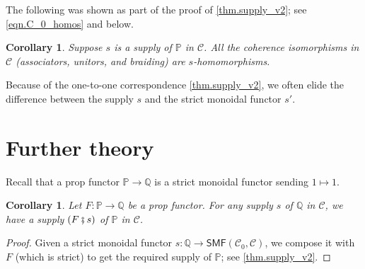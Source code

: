 \documentclass[11pt, oneside, article]{memoir}
\theoremstyle{plain}
\newtheorem{corollary}[theorem]{Corollary}
\theoremstyle{definition}
\theoremstyle{remark}
\newcommand{\cat}[1]{\mathcal{#1}}%
\newcommand{\Cat}[1]{{\mathsf{#1}}}%
\newcommand{\smf}{\Cat{SMF}}
\newcommand{\pp}{\mathbb{P}}
\newcommand{\qq}{\mathbb{Q}}
\newcommand{\mob}[1]{#1_0}
\newcommand{\cp}{\mathbin{\fatsemi}}
\begin{document}
The following was shown as part of the proof of \cref{thm.supply_v2}; see \cref{eqn.C_0_homos} and below.
\begin{corollary}\label{cor.coherence_isos_homos}
Suppose $s$ is a supply of $\pp$ in $\cat{C}$. All the coherence isomorphisms in $\cat{C}$ (associators, unitors, and braiding) are $s$-homomorphisms.
\end{corollary}

Because of the one-to-one correspondence \cref{thm.supply_v2}, we often elide the difference between the supply $s$ and the strict monoidal functor $s'$. 

\section{Further theory}\label{sec.further_theory}

Recall that a prop functor $\pp\to\qq$ is a strict monoidal functor sending $1\mapsto 1$.

\begin{corollary}\label{cor.change_of_supply}
Let $F\colon\pp\to\qq$ be a prop functor. For any supply $s$ of $\qq$ in $\cat{C}$, we have a supply $(F\cp s)$ of $\pp$ in $\cat{C}$.
\end{corollary}
\begin{proof}
Given a strict monoidal functor $s\colon\qq\to\smf(\mob{\cat{C}},\cat{C})$, we compose it with $F$ (which is strict) to get the required supply of $\pp$; see \cref{thm.supply_v2}.
\end{proof}
\end{document}
